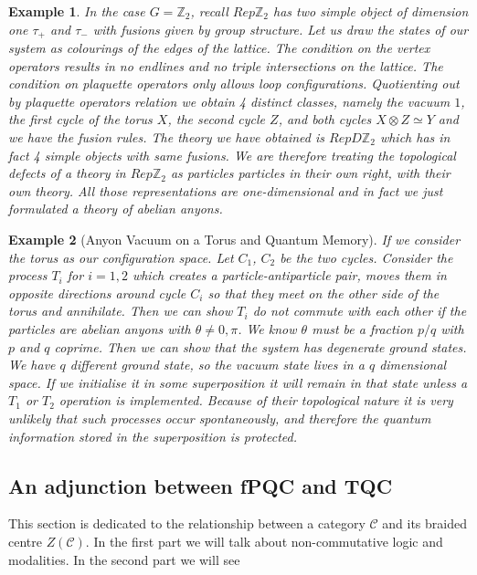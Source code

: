 \documentclass{article}
\newtheorem{example}{Example}
\begin{document}
\begin{example}
	In the case $G=\mathbb{Z}_2$, recall $Rep\mathbb{Z}_2$ has two simple object of dimension one $\tau_+$ and $\tau_-$ with fusions given by group structure. Let us draw the states of our system as colourings of the edges of the lattice. The condition on the vertex operators results in no endlines and no triple intersections on the lattice. The condition on plaquette operators only allows loop configurations. Quotienting out by plaquette operators relation we obtain 4 distinct classes, namely the vacuum $1$, the first cycle of the torus $X$, the second cycle $Z$, and both cycles $X \otimes Z \simeq Y$ and we have the fusion rules. The theory we have obtained is $RepD\mathbb{Z}_2$ which has in fact 4 simple objects with same fusions. We are therefore treating the topological defects of a theory in $Rep\mathbb{Z}_2$ as particles particles in their own right, with their own theory. All those representations are one-dimensional and in fact we just formulated a theory of abelian anyons.
\end{example}

\begin{example}[Anyon Vacuum on a Torus and Quantum Memory]
	If we consider the torus as our configuration space. Let $C_1$, $C_2$ be the two cycles. Consider the process $T_i$ for $i=1,2$ which creates a particle-antiparticle pair, moves them in opposite directions around cycle $C_i$ so that they meet on the other side of the torus and annihilate. Then we can show $T_i$ do not commute with each other if the particles are abelian anyons with $\theta \neq 0, \pi$. We know $\theta$ must be a fraction $p/q$ with $p$ and $q$ coprime. Then we can show that the system has degenerate ground states. We have $q$ different ground state, so the vacuum state lives in a $q$ dimensional space. If we initialise it in some superposition it will remain in that state unless a $T_1$ or $T_2$ operation is implemented. Because of their topological nature it is very unlikely that such processes occur spontaneously, and therefore the quantum information stored in the superposition is protected.
\end{example}

\subsection{An adjunction between fPQC and TQC}
This section is dedicated to the relationship between a category $\mathcal{C}$ and its braided centre $Z(\mathcal{C})$. In the first part we will talk about non-commutative logic and modalities. In the second part we will see \\
\end{document}
